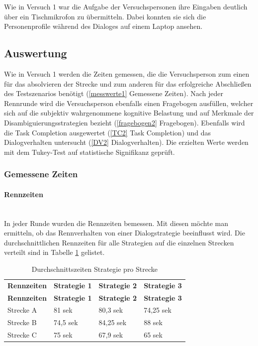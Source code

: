 \documentclass[12pt,a4paper]{scrartcl}
\begin{document}
Wie in Versuch 1 war die Aufgabe der Versuchspersonen ihre Eingaben deutlich über ein Tischmikrofon zu übermitteln. Dabei konnten sie sich die Personenprofile während des Dialoges auf einem Laptop ansehen.



\subsection{Auswertung}
\label{auswertung2}
Wie in Versuch 1 werden die Zeiten gemessen, die die Versuchsperson zum einen für das absolvieren der Strecke und zum anderen für das erfolgreiche Abschließen des Testszenarios benötigt (\ref{messwerte1} Gemessene Zeiten).
Nach jeder Rennrunde wird die Versuchsperson ebenfalls einen Fragebogen ausfüllen, welcher sich auf die subjektiv wahrgenommene kognitive Belastung und auf Merkmale der Disambiguierungsstrategien bezieht (\ref{fragebogen2} Fragebogen). Ebenfalls wird die Task Completion ausgewertet (\ref{TC2} Task Completion) und das Dialogverhalten untersucht (\ref{DV2} Dialogverhalten). Die erzielten Werte werden mit dem Tukey-Test
auf statistische Signifikanz geprüft. 
\subsubsection{Gemessene Zeiten}
\label{messwerte}
\paragraph{Rennzeiten} 
~\\
In jeder Runde wurden die Rennzeiten bemessen. Mit diesen möchte man ermitteln, ob das Rennverhalten von einer Dialogstrategie beeinflusst wird. 
Die durchschnittlichen Rennzeiten für alle Strategien auf die einzelnen Strecken verteilt sind in Tabelle \ref{RZ3SV2} gelistet. 
\begin{longtable}{p{3cm}p{3cm}p{3cm}p{3cm} }
	\label{RZ3SV2}\\
	\caption[Durchschnittszeiten Strategie pro Strecke]{Durchschnittszeiten Strategie pro Strecke}\\
	\hline
	\textbf{Rennzeiten}&\textbf{Strategie 1}&\textbf{Strategie 2} &\textbf{Strategie 3}\\
	\hline
	\endfirsthead
	\hline
	\textbf{Rennzeiten}&\textbf{Strategie 1}&\textbf{Strategie 2} &\textbf{Strategie 3}\\
	\hline
	\endhead
Strecke A & 81 sek & 80,3 sek & 74,25 sek \\
Strecke B & 74,5 sek & 84,25 sek & 88 sek \\
Strecke C & 75 sek & 67,9 sek & 65 sek \\
\hline
\end{longtable}
\end{document}

